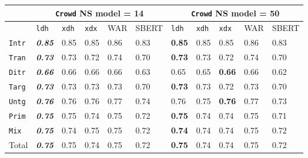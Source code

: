\documentclass[handout,xcolor={dvipsnames}]{beamer}
\newcommand{\feat}[1]{\textsc{#1}}
\newcommand{\param}[1]{\texttt{#1}}
\begin{document}
\begin{frame}
\begin{table}[htb!]
\begin{center}
\setlength{\tabcolsep}{.35em}
\begin{tabular}{|l||l|l|l||l|l||l|l|l||l|l|}
\hline
 & \multicolumn{5}{c||}{\param{Crowd} NS model = 14} & \multicolumn{5}{c|}{\param{Crowd} NS model = 50} \\
\hline
    		& \param{ldh}	& \param{xdh} &	\param{xdx} & WAR	& {\scriptsize SBERT} & \param{ldh}	& \param{xdh} &	\param{xdx} & WAR	& {\scriptsize SBERT} \\ \hline
\hline
\param{Intr}   & \textbf{\textit{0.85}} & 0.85 & 0.85 & 0.86 & 0.83  & \textbf{0.85} & 0.85 & 0.85 & 0.86 & 0.83 \\ \hline
\param{Tran}    & \textit{\textbf{0.73}} & 0.73 & 0.72 & 0.74 & 0.70   & \textbf{0.73} & 0.73 & 0.72 & 0.74 & 0.70 \\ \hline
\param{Ditr}    & \textit{\textbf{0.66}} & 0.66 & 0.66 & 0.66 & 0.63  & 0.65 & 0.65 & \textbf{0.66} & 0.66 & 0.62 \\ \hline
\hline
\param{Targ}    & \textit{\textbf{0.73}} & 0.73 & 0.73 & 0.73 & 0.70  & \textbf{0.73} & 0.73 & 0.72 & 0.73 & 0.70 \\ \hline
\param{Untg}    & \textit{\textbf{0.76}} & 0.76 & 0.76 & 0.77 & 0.74  & 0.76 & 0.75 & \textbf{0.76} & 0.77 & 0.73 \\ \hline
\hline
\param{Prim}    & \textit{\textbf{0.75}} & 0.75 & 0.74 & 0.75 & 0.72  & \textbf{0.75} & 0.74 & 0.74 & 0.75 & 0.71 \\ \hline
\param{Mix}      & \textit{\textbf{0.75}} & 0.74 & 0.75 & 0.75 & 0.72  & \textbf{0.74} & 0.74 & 0.74 & 0.75 & 0.72 \\ \hline
\hline
Total 	 & \textit{\textbf{0.75}} & 0.75 & 0.74 & 0.75 & 0.72 	& \textbf{0.75} & 0.74 & 0.74 & 0.75 & 0.72 \\ \hline
\end{tabular}
\end{center}
\end{table}


\end{frame}
\end{document}
